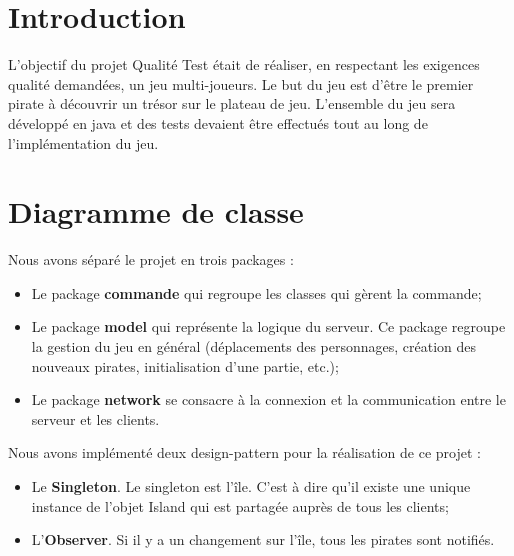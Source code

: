 \newpage
\section{Introduction}

L’objectif du projet Qualité Test était de réaliser, en respectant les exigences qualité demandées, un jeu multi-joueurs. Le but du jeu est d’être le premier pirate à découvrir un trésor sur le plateau de jeu. L’ensemble du jeu sera développé en java et des tests devaient être effectués tout au long de l’implémentation du jeu. 

\section{Diagramme de classe}

Nous avons séparé le projet en trois packages : \\

\begin{itemize}
\item Le package \textbf{commande} qui regroupe les classes qui gèrent la commande;
\item Le package \textbf{model} qui représente la logique du serveur. Ce package regroupe la gestion du jeu en général (déplacements des personnages, création des nouveaux pirates, initialisation d’une partie, etc.);
\item Le package \textbf{network}  se consacre à la connexion et la communication entre le serveur et les clients.\\ 
\end{itemize}

Nous avons implémenté deux design-pattern pour la réalisation de ce projet : \\

\begin{itemize}
\item Le \textbf{Singleton}. Le singleton est l’île. C’est à dire qu’il existe une unique instance de l’objet Island qui est partagée auprès de tous les clients;
\item L’\textbf{Observer}. Si il y a un changement sur l’île, tous les pirates sont notifiés. 
\end{itemize}


